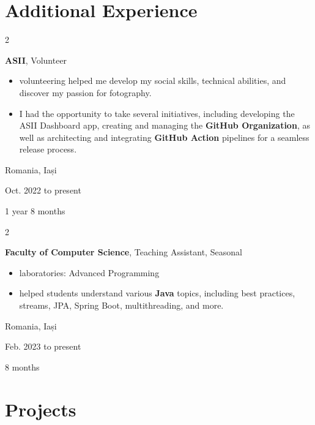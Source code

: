 \documentclass[10pt, letterpaper]{article}
\newenvironment{highlights}{
    \begin{itemize}[
        topsep=0.10 cm,
        parsep=0.10 cm,
        partopsep=0pt,
        itemsep=0pt,
        leftmargin=0.4 cm + 10pt
    ]
}{
    \end{itemize}
} %
\newenvironment{twocolentry}[2][]{
    \onecolentry
    \def\secondColumn{#2}
    \setcolumnwidth{\fill, 4.5 cm}
    \begin{paracol}{2}
}{
    \switchcolumn \raggedleft \secondColumn
    \end{paracol}
    \endonecolentry
} %
\begin{document}
    \section{Additional Experience}



        
        \begin{twocolentry}{
            Romania, Iași

            Oct. 2022 to present

            1 year 8 months
        }
            \textbf{ASII}, Volunteer
            \begin{highlights}
                \item volunteering helped me develop my social skills, technical abilities, and discover my passion for fotography.
                
                \item I had the opportunity to take several initiatives, 
                including developing the ASII Dashboard app, creating and managing the \textbf{GitHub Organization}, as well as architecting and integrating \textbf{GitHub Action} pipelines for a seamless release process.
            \end{highlights}
        \end{twocolentry}


        
        
        \vspace{0.2 cm}



        \begin{twocolentry}{
            Romania, Iași

            Feb. 2023 to present

            8 months
        }
            \textbf{Faculty of Computer Science}, Teaching Assistant, Seasonal
            \begin{highlights}
                \item laboratories: Advanced Programming

                \item helped students understand various \textbf{Java} topics, including best practices, streams, JPA, Spring Boot, multithreading, and more.
            \end{highlights}
        \end{twocolentry}





    
    \section{Projects}
\end{document}
